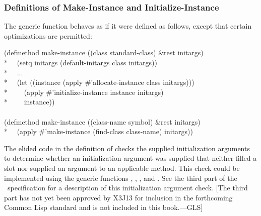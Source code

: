 \subsubsection{Definitions of Make-Instance and Initialize-Instance}

The generic function  behaves as if it were defined as
follows, except that certain optimizations are permitted:


\begin{lisp}
(defmethod make-instance ((class standard-class) \&rest initargs) \\*
~~(setq initargs (default-initargs class initargs)) \\*
~~... \\*
~~(let ((instance (apply \#'allocate-instance class initargs))) \\*
~~~~(apply \#'initialize-instance instance initargs) \\*
~~~~instance)) \\
\\
(defmethod make-instance ((class-name symbol) \&rest initargs) \\*
~~(apply \#'make-instance (find-class class-name) initargs))
\end{lisp}


The elided code in the definition of  checks the
supplied initialization arguments to determine whether an initialization
argument was supplied that neither filled a slot nor supplied an argument
to an applicable method. This check could be implemented using the generic
functions , , 
, and . See the third
part of the \CLOS\ specification for a
description of this initialization argument check.
[The third part
has not yet been approved by X3J13 for inclusion in the forthcoming
Common Lisp standard and is not included in this book.---GLS]

